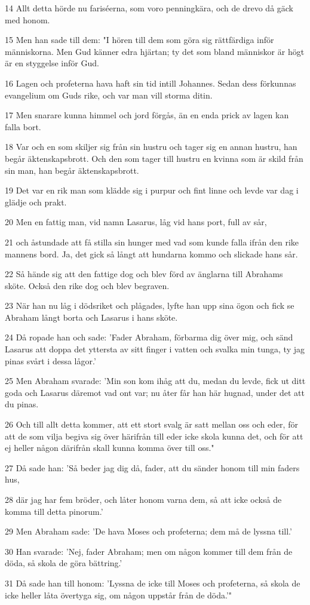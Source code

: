 \par 14 Allt detta hörde nu fariséerna, som voro penningkära, och de drevo då gäck med honom.
\par 15 Men han sade till dem: "I hören till dem som göra sig rättfärdiga inför människorna. Men Gud känner edra hjärtan; ty det som bland människor är högt är en styggelse inför Gud.
\par 16 Lagen och profeterna hava haft sin tid intill Johannes. Sedan dess förkunnas evangelium om Guds rike, och var man vill storma ditin.
\par 17 Men snarare kunna himmel och jord förgås, än en enda prick av lagen kan falla bort.
\par 18 Var och en som skiljer sig från sin hustru och tager sig en annan hustru, han begår äktenskapsbrott. Och den som tager till hustru en kvinna som är skild från sin man, han begår äktenskapsbrott.
\par 19 Det var en rik man som klädde sig i purpur och fint linne och levde var dag i glädje och prakt.
\par 20 Men en fattig man, vid namn Lasarus, låg vid hans port, full av sår,
\par 21 och åstundade att få stilla sin hunger med vad som kunde falla ifrån den rike mannens bord. Ja, det gick så långt att hundarna kommo och slickade hans sår.
\par 22 Så hände sig att den fattige dog och blev förd av änglarna till Abrahams sköte. Också den rike dog och blev begraven.
\par 23 När han nu låg i dödsriket och plågades, lyfte han upp sina ögon och fick se Abraham långt borta och Lasarus i hans sköte.
\par 24 Då ropade han och sade: 'Fader Abraham, förbarma dig över mig, och sänd Lasarus att doppa det yttersta av sitt finger i vatten och svalka min tunga, ty jag pinas svårt i dessa lågor.'
\par 25 Men Abraham svarade: 'Min son kom ihåg att du, medan du levde, fick ut ditt goda och Lasarus däremot vad ont var; nu åter får han här hugnad, under det att du pinas.
\par 26 Och till allt detta kommer, att ett stort svalg är satt mellan oss och eder, för att de som vilja begiva sig över härifrån till eder icke skola kunna det, och för att ej heller någon därifrån skall kunna komma över till oss."
\par 27 Då sade han: 'Så beder jag dig då, fader, att du sänder honom till min faders hus,
\par 28 där jag har fem bröder, och låter honom varna dem, så att icke också de komma till detta pinorum.'
\par 29 Men Abraham sade: 'De hava Moses och profeterna; dem må de lyssna till.'
\par 30 Han svarade: 'Nej, fader Abraham; men om någon kommer till dem från de döda, så skola de göra bättring.'
\par 31 Då sade han till honom: 'Lyssna de icke till Moses och profeterna, så skola de icke heller låta övertyga sig, om någon uppstår från de döda.'"

